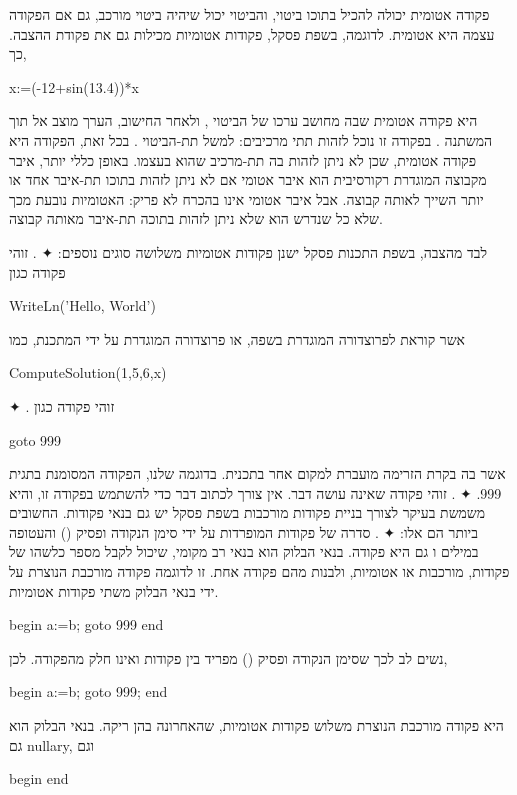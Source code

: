 פקודה אטומית יכולה להכיל בתוכו ביטוי, והביטוי יכול שיהיה ביטוי מורכב, גם אם
הפקודה עצמה היא אטומית.
לדוגמה, בשפת פסקל, פקודות אטומיות מכילות גם את פקודת ההצבה. כך, 
\begin{PASCAL}
x:=(-12+sin(13.4))*x
\end{PASCAL}
היא פקודה אטומית שבה מחושב ערכו של הביטוי ,
ולאחר החישוב, הערך מוצב אל תוך המשתנה .
בפקודה זו נוכל לזהות תתי מרכיבים: למשל תת-הביטוי .
 בכל זאת, הפקודה היא פקודה אטומית, שכן לא ניתן לזהות בה תת-מרכיב שהוא 
 בעצמו.  באופן כללי יותר, איבר מקבוצה המוגדרת רקורסיבית הוא איבר אטומי אם
לא ניתן לזהות בתוכו תת-איבר אחד או יותר השייך לאותה קבוצה. אבל איבר אטומי אינו
בהכרח לא פריק: האטומיות נובעת מכך שלא כל שנדרש הוא שלא ניתן לזהות בתוכה תת-איבר
מאותה קבוצה.

לבד מהצבה, בשפת התכנות פסקל ישנן פקודות אטומיות משלושה סוגים נוספים:
✦ . זוהי פקודה כגון
\begin{PASCAL}
WriteLn('Hello, World')
\end{PASCAL}
אשר קוראת לפרוצדורה המוגדרת בשפה, או פרוצדורה המוגדרת על ידי המתכנת, כמו
\begin{PASCAL}
ComputeSolution(1,5,6,x)
\end{PASCAL}
✦ . זוהי פקודה כגון
\begin{PASCAL}
goto 999
\end{PASCAL}
אשר בה בקרת הזרימה מועברת למקום אחר בתכנית. בדוגמה שלנו, הפקודה המסומנת בתגית
999.
✦ . זוהי פקודה שאינה עושה דבר. אין צורך לכתוב דבר כדי
להשתמש בפקודה זו, והיא משמשת בעיקר לצורך בניית פקודות מורכבות
בשפת פסקל יש גם בנאי פקודות. החשובים ביותר הם אלו:
✦ . סדרה של פקודות המופרדות על ידי סימן הנקודה ופסיק ()
והעטופה במילים  ו גם היא פקודה. בנאי הבלוק הוא בנאי רב
מקומי, שיכול לקבל מספר כלשהו של פקודות, מורכבות או אטומיות, ולבנות מהם פקודה
אחת. זו לדוגמה פקודה מורכבת הנוצרת על ידי בנאי הבלוק משתי פקודות אטומיות.
\begin{PASCAL}
begin
  a:=b;
  goto 999
end
\end{PASCAL}
נשים לב לכך שסימן הנקודה ופסיק () מפריד בין פקודות ואינו חלק מהפקודה.
לכן,
\begin{PASCAL}
begin
  a:=b;
  goto 999;
end
\end{PASCAL}
היא פקודה מורכבת הנוצרת משלוש פקודות אטומיות, שהאחרונה בהן ריקה. בנאי הבלוק הוא
גם nullary, וגם \begin{PASCAL}
begin
end
\end{PASCAL}
